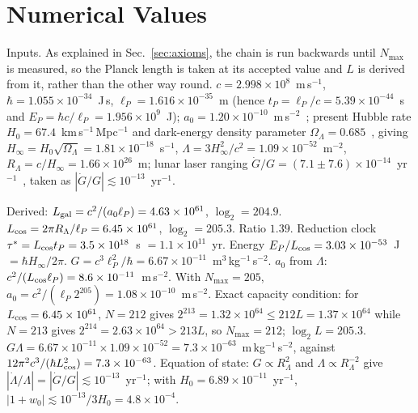 \documentclass[aps,prd,twocolumn,superscriptaddress,nofootinbib,showkeys]{revtex4-2}
\begin{document}
\appendix

\section{Numerical Values}
\label{app:numbers}

Inputs. As explained in Sec.~\ref{sec:axioms}, the chain is run backwards until $N_{\max}$ is measured, so the Planck length is taken at its accepted value and $L$ is derived from it, rather than the other way round. $c = 2.998\times10^8$~m\,s$^{-1}$, $\hbar = 1.055\times10^{-34}$~J\,s, $\ell_P = 1.616\times10^{-35}$~m (hence $t_P = \ell_P/c = 5.39\times10^{-44}$~s and $E_P = \hbar c/\ell_P = 1.956\times10^9$~J); $a_0 = 1.20\times10^{-10}$~m\,s$^{-2}$~\cite{mcgaugh2016}; present Hubble rate $H_0 = 67.4$~km\,s$^{-1}$\,Mpc$^{-1}$ and dark-energy density parameter $\Omega_\Lambda = 0.685$~\cite{planck2018}, giving $H_\infty = H_0\sqrt{\Omega_\Lambda} = 1.81\times10^{-18}$~s$^{-1}$, $\Lambda = 3H_\infty^2/c^2 = 1.09\times10^{-52}$~m$^{-2}$, $R_\Lambda = c/H_\infty = 1.66\times10^{26}$~m; lunar laser ranging $\dot G/G = (7.1\pm7.6)\times10^{-14}$~yr$^{-1}$~\cite{hofmann2018}, taken as $|\dot G/G|\lesssim10^{-13}$~yr$^{-1}$.

Derived: $L_{\rm gal} = c^2/(a_0\ell_P) = 4.63\times10^{61}$, $\log_2 = 204.9$. $L_{\rm cos} = 2\pi R_\Lambda/\ell_P = 6.45\times10^{61}$, $\log_2 = 205.3$. Ratio $1.39$. Reduction clock $\tau^* = L_{\rm cos}t_P = 3.5\times10^{18}$~s $= 1.1\times10^{11}$~yr. Energy $E_P/L_{\rm cos} = 3.03\times10^{-53}$~J $= \hbar H_\infty/2\pi$. $G = c^3\ell_P^2/\hbar = 6.67\times10^{-11}$~m$^3$\,kg$^{-1}$\,s$^{-2}$. $a_0$ from $\Lambda$: $c^2/(L_{\rm cos}\ell_P) = 8.6\times10^{-11}$~m\,s$^{-2}$. With $N_{\max} = 205$, $a_0 = c^2/(\ell_P 2^{205}) = 1.08\times10^{-10}$~m\,s$^{-2}$. Exact capacity condition: for $L_{\rm cos} = 6.45\times10^{61}$, $N=212$ gives $2^{213} = 1.32\times10^{64}\le 212L = 1.37\times10^{64}$ while $N=213$ gives $2^{214} = 2.63\times10^{64} > 213L$, so $N_{\max}=212$; $\log_2 L = 205.3$. $G\Lambda = 6.67\times10^{-11}\times1.09\times10^{-52} = 7.3\times10^{-63}$~m\,kg$^{-1}$\,s$^{-2}$, against $12\pi^2c^3/(\hbar L_{\rm cos}^2) = 7.3\times10^{-63}$. Equation of state: $G\propto R_\Lambda^2$ and $\Lambda\propto R_\Lambda^{-2}$ give $|\dot\Lambda/\Lambda| = |\dot G/G|\lesssim10^{-13}$~yr$^{-1}$; with $H_0 = 6.89\times10^{-11}$~yr$^{-1}$, $|1+w_0| \lesssim 10^{-13}/3H_0 = 4.8\times10^{-4}$.
\end{document}
